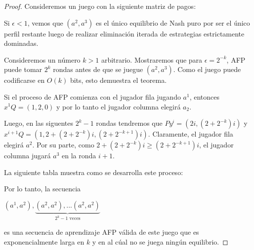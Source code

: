 \documentclass{article}
\begin{document}
\begin{proof}
    Consideremos un juego con la siguiente matriz de pagos:

    

    Si $\epsilon < 1$, vemos que $(a^2, a^3)$ es el único equilibrio de Nash puro
    por ser el único perfil restante luego de realizar eliminación iterada de estrategias estrictamente dominadas.

    Consideremos un número $k > 1$ arbitrario. Mostraremos que para $\epsilon = 2^{-k}$, AFP puede tomar $2^k$ rondas antes de que
    se juegue $(a^2, a^3)$. Como el juego puede codificarse en $O(k)$ bits, esto demuestra el teorema.

    Si el proceso de AFP comienza con el jugador fila jugando $a^1$, entonces $x^1Q = (1, 2, 0)$ y por lo tanto
    el jugador columna elegirá $a_2$.

    Luego, en las siguentes $2^k - 1$ rondas tendremos que $Py^i = (2i, (2+2^{-k})i)$ y $x^{i+1}Q = (1, 2+(2+2^{-k})i, (2+2^{-k+1})i)$.
    Claramente, el jugador fila elegirá $a^2$.
    Por su parte, como $2+(2+2^{-k})i \ge (2+2^{-k+1})i$, el jugador columna jugará $a^3$ en la ronda $i + 1$.

    La siguiente tabla muestra como se desarrolla este proceso:

    

    Por lo tanto, la secuencia

    \begin{center}
    \begin{math}
        (a^1, a^2), \underbrace{(a^2, a^2), ... (a^2, a^2)}_{\text{$2^k - 1$ veces}}
    \end{math}
    \end{center}

    es una secuencia de aprendizaje AFP válida de este juego que es exponencialmente larga en $k$ y en al cúal no se juega ningún equilibrio.

\end{proof}
\end{document}
